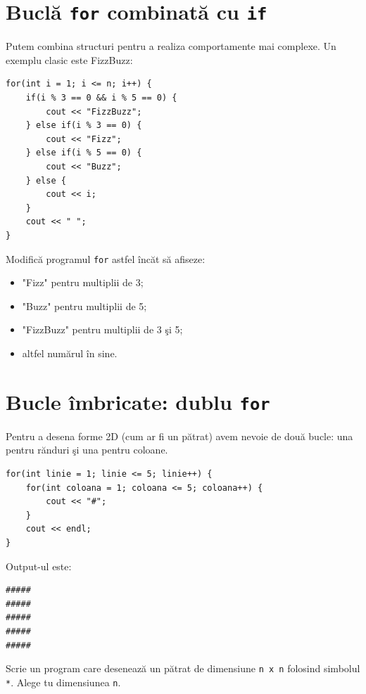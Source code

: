 \documentclass[11pt,a4paper]{article}
\begin{document}
\section*{Bucl\u{a} \texttt{for} combinat\u{a} cu \texttt{if}}
Putem combina structuri pentru a realiza comportamente mai complexe. Un exemplu clasic este FizzBuzz:

\begin{examplebox}[FizzBuzz]
\begin{lstlisting}[style=cpp]
for(int i = 1; i <= n; i++) {
    if(i % 3 == 0 && i % 5 == 0) {
        cout << "FizzBuzz";
    } else if(i % 3 == 0) {
        cout << "Fizz";
    } else if(i % 5 == 0) {
        cout << "Buzz";
    } else {
        cout << i;
    }
    cout << " ";
}
\end{lstlisting}
\end{examplebox}

\begin{tryit}
Modific\u{a} programul \texttt{for} astfel \^{i}nc\u{a}t s\u{a} afiseze:
\begin{itemize}
\item "Fizz" pentru multiplii de 3;
\item "Buzz" pentru multiplii de 5;
\item "FizzBuzz" pentru multiplii de 3 \c{s}i 5;
\item altfel num\u{a}rul \^{i}n sine.
\end{itemize}
\end{tryit}

\section*{Bucle \^{i}mbricate: dublu \texttt{for}}
Pentru a desena forme 2D (cum ar fi un p\u{a}trat) avem nevoie de dou\u{a} bucle: una pentru r\u{a}nduri \c{s}i una pentru coloane.

\begin{examplebox}
\begin{lstlisting}[style=cpp]
for(int linie = 1; linie <= 5; linie++) {
    for(int coloana = 1; coloana <= 5; coloana++) {
        cout << "#";
    }
    cout << endl;
}
\end{lstlisting}
Output-ul este:
\begin{verbatim}
#####
#####
#####
#####
#####
\end{verbatim}
\end{examplebox}

\begin{tryit}
Scrie un program care deseneaz\u{a} un p\u{a}trat de dimensiune \texttt{n x n} folosind simbolul \texttt{*}. Alege tu dimensiunea \texttt{n}.
\end{tryit}
\end{document}
